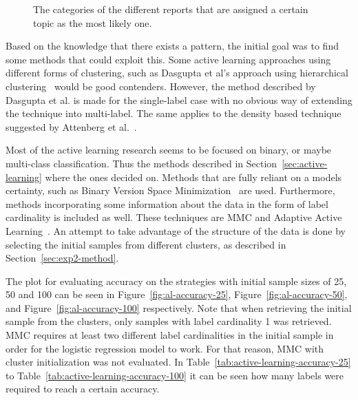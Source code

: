 \begin{figure}[h!]
    \centering
    \quad
    \caption{The categories of the different reports that are assigned a certain topic as the most likely one.}
    \label{fig:topic-category-distribution}
\end{figure}

Based on the knowledge that there exists a pattern, the initial goal was to find some methods that could exploit this.
Some active learning approaches using different forms of clustering, such as Dasgupta et al\@'s approach using hierarchical clustering~\cite{dasgupta2008hierarchical} would be good contenders.
However, the method described by Dasgupta et al\@. is made for the single-label case with no obvious way of extending the technique into multi-label.
The same applies to the density based technique suggested by Attenberg et al\@.~\cite{attenberg2013class}.

Most of the active learning research seems to be focused on binary, or maybe multi-class classification.
Thus the methods described in Section~\ref{sec:active-learning} where the ones decided on.
Methods that are fully reliant on a models certainty, such as Binary Version Space Minimization~\cite{brinker2006active} are used.
Furthermore, methods incorporating some information about the data in the form of label cardinality is included as well.
These techniques are MMC and Adaptive Active Learning~\cite{yang2009effective, li2013active}.
An attempt to take advantage of the structure of the data is done by selecting the initial samples from different clusters, as described in Section~\ref{sec:exp2-method}.

The plot for evaluating accuracy on the strategies with initial sample sizes of 25, 50 and 100 can be seen in Figure~\ref{fig:al-accuracy-25}, Figure~\ref{fig:al-accuracy-50}, and Figure~\ref{fig:al-accuracy-100} respectively.
Note that when retrieving the initial sample from the clusters, only samples with label cardinality 1 was retrieved.
MMC requires at least two different label cardinalities in the initial sample in order for the logistic regression model to work.
For that reason, MMC with cluster initialization was not evaluated.
In Table~\ref{tab:active-learning-accuracy-25} to Table~\ref{tab:active-learning-accuracy-100} it can be seen how many labels were required to reach a certain accuracy.

